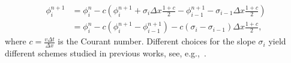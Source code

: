 \documentclass[../thesis.tex]{subfiles}
\begin{document}
\begin{equation}\label{eqn:second-order-implicit}
    \begin{split}
        \phi_{i}^{n+1}
        &= \phi_{i}^{n} - c\left(
            \phi_{i}^{n+1}
            + \sigma_{i}\Delta x\frac{1+c}{2} - \phi_{i-1}^{n+1}
            -\sigma_{i-1}\Delta x\frac{1+c}{2} \right)
        \\
        &= \phi_{i}^{n} - c\left(
            \phi_{i}^{n+1}
            - \phi_{i-1}^{n+1}
            \right)
            -c\left(
            \sigma_{i} - \sigma_{i-1}
            \right)\Delta x\frac{1+c}{2},
    \end{split}
\end{equation}
where \(c = \frac{v\Delta t}{\Delta x}\) is the Courant number.
Different choices for the slope \(\sigma_{i}\)
yield different schemes studied in previous works,
see, e.g.,~\cite{2018_Frolkovic,2023_Frolkovic,2014_Mikula}.
\end{document}
